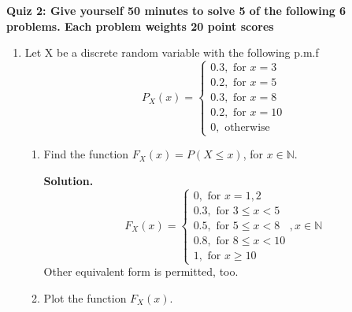\documentclass[12pt]{article}
\begin{document}
\noindent
{\bf{Quiz 2: Give yourself 50 minutes to solve 5 of the following 6 problems. Each problem weights 20 point scores}}
\begin{enumerate}

\item
Let X be a discrete random variable with the following p.m.f
\[
    P_X(x) = \begin{cases}
        0.3, \text{ for } x = 3 \\
        0.2, \text{ for } x = 5 \\
        0.3, \text{ for } x = 8 \\
        0.2, \text{ for } x = 10 \\
        0, \text{ otherwise}
    \end{cases}
\]
\begin{enumerate}
    \item Find the function \(F_X(x) = P(X \leq  x)\), for \(x \in \mathbb{N}\).
    
    \textbf{Solution.} 
    \[
        F_X(x) = \begin{cases} 0,  \text{ for } x = 1,2 \\
            0.3, \text{ for } 3 \leq x < 5 \\
            0.5, \text{ for } 5 \leq  x < 8 \\
            0.8, \text{ for } 8 \leq x < 10 \\
            1, \text{ for } x \geq  10
        \end{cases}, x \in \mathbb{N}
    \] 
    Other equivalent form is permitted, too.
    \item Plot the function \(F_X(x)\).\\
\end{enumerate}







\end{enumerate}
\end{document}
